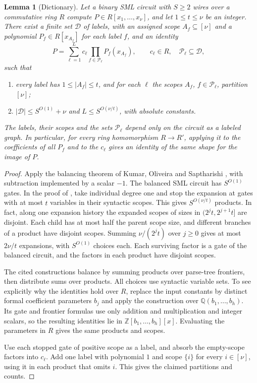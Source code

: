 \documentclass[11pt]{article}
\newtheorem{lemma}[theorem]{Lemma}
\theoremstyle{remark}
\newcommand{\cD}{\mathcal D}
\newcommand{\cP}{\mathcal P}
\begin{document}
\begin{lemma}[Dictionary]\label{lem:dict}
Let a binary SML circuit with \(S\ge2\) wires over a commutative ring
\(R\) compute \(P\in R[x_1,\ldots,x_\nu]\), and let \(1\le t\le\nu\) be an
integer. There exist a finite set \(\cD\) of \emph{labels}, with an
\emph{assigned scope} \(A_f\subseteq[\nu]\) and a polynomial
\(P_f\in R[x_{A_f}]\) for each label \(f\), and an identity
\begin{equation}\label{eq:dict}
 P=\sum_{\ell=1}^Lc_\ell\prod_{f\in\cP_\ell}P_f(x_{A_f}),
 \qquad c_\ell\in R,\quad\cP_\ell\subseteq\cD,
\end{equation}
such that
\begin{enumerate}
\item every label has \(1\le|A_f|\le t\), and for each \(\ell\) the scopes
\(A_f\), \(f\in\cP_\ell\), partition \([\nu]\);
\item \(|\cD|\le S^{O(1)}+\nu\) and \(L\le S^{O(\nu/t)}\), with absolute constants.
\end{enumerate}
The labels, their scopes and the sets \(\cP_\ell\) depend only on the
circuit as a labeled graph. In particular, for every ring homomorphism
\(R\to R'\), applying it to the coefficients of all \(P_f\) and to the
\(c_\ell\) gives an identity of the same shape for the image of \(P\).
\end{lemma}

\begin{proof}
Apply the balancing theorem of Kumar, Oliveira and Saptharishi
\cite[Theorem 20]{kos}, with subtraction implemented by a scalar
\(-1\). The balanced SML circuit has \(S^{O(1)}\) gates. In the proof
of \cite[Lemma 21]{kos}, take individual degree one and stop the expansion
at gates with at most \(t\) variables in their syntactic scopes. This
gives \(S^{O(\nu/t)}\) products. In fact, along one expansion history
the expanded scopes of sizes in \((2^jt,2^{j+1}t]\) are disjoint.
Each child has at most half the parent scope size, and different
branches of a product have disjoint scopes. Summing \(\nu/(2^jt)\)
over \(j\ge0\) gives at most
\(2\nu/t\) expansions, with \(S^{O(1)}\) choices each. Each surviving
factor is a gate of the balanced circuit, and the factors in each
product have disjoint scopes.

The cited constructions balance by summing products over parse-tree
frontiers, then distribute sums over products. All choices use syntactic
variable sets. To see explicitly why the identities hold over \(R\),
replace the input constants by distinct formal coefficient parameters
\(b_j\) and apply the construction over \(\mathbb Q(b_1,\ldots,b_h)\).
Its gate and frontier formulas use only addition and multiplication
and integer scalars, so the resulting identities lie in
\(\mathbb Z[b_1,\ldots,b_h][x]\). Evaluating the parameters in \(R\)
gives the same products and scopes.

Use each stopped gate of positive scope as a label, and absorb the
empty-scope factors into \(c_\ell\). Add one label with polynomial \(1\)
and scope \(\{i\}\) for every \(i\in[\nu]\), using it in each product
that omits \(i\). This gives the claimed partitions and counts.
\end{proof}
\end{document}
